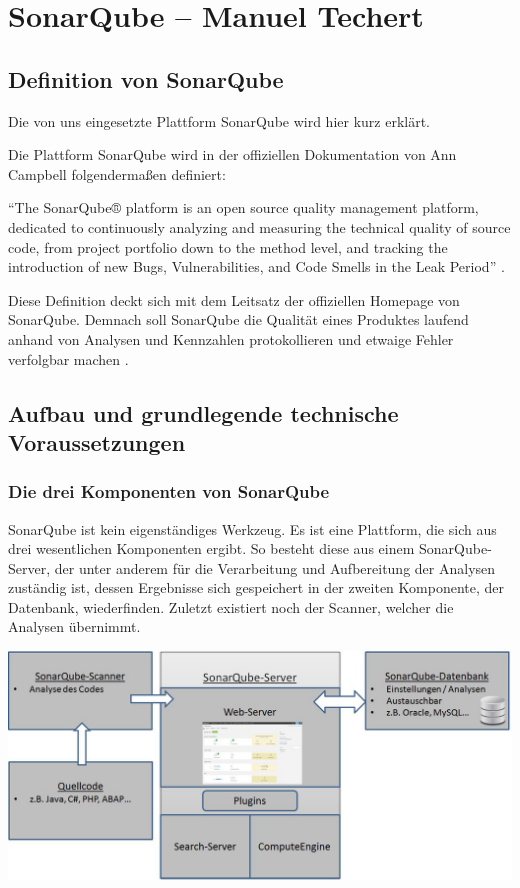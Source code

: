 \chapter{SonarQube -- Manuel Techert}


\section{Definition von SonarQube}

Die von uns eingesetzte Plattform SonarQube wird hier kurz erklärt.

Die Plattform SonarQube wird in der offiziellen Dokumentation von Ann Campbell folgendermaßen definiert:

\enquote{The SonarQube® platform is an open source quality management platform, dedicated to continuously analyzing and measuring the technical quality of source code, from project portfolio down to the method level, and tracking the introduction of new Bugs, Vulnerabilities, and Code Smells in the Leak Period} \autocite{DefinitionSonarQubeDoc}.

Diese Definition deckt sich mit dem Leitsatz der offiziellen Homepage von SonarQube. Demnach soll SonarQube  die Qualität eines Produktes laufend anhand von Analysen und Kennzahlen protokollieren und etwaige Fehler verfolgbar machen \autocite[Vgl.][]{StartSeiteSonarQube}.


\section{Aufbau und grundlegende technische Voraussetzungen}

\subsection{Die drei Komponenten von SonarQube}

SonarQube ist kein eigenständiges Werkzeug. Es ist eine Plattform, die sich aus drei wesentlichen Komponenten ergibt. 
So besteht diese aus einem SonarQube-Server, der unter anderem für die Verarbeitung und Aufbereitung der Analysen zuständig ist, dessen Ergebnisse sich gespeichert in der zweiten Komponente, der Datenbank, wiederfinden. Zuletzt existiert noch der Scanner, welcher die Analysen übernimmt.


\begin{minipage}{\linewidth}
	\centering
	\includegraphics[scale=0.45]{img/SonarAufbau.jpg}
	\vspace{2em}
\end{minipage}

